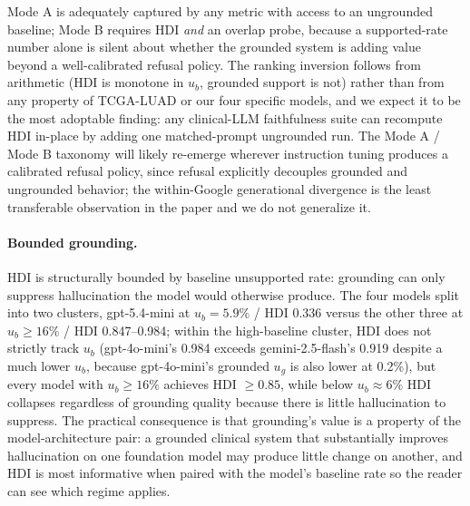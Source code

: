 \documentclass{article}
\theoremstyle{plain}
\begin{document}
Mode A is adequately captured by any metric with access to an ungrounded baseline; Mode B requires HDI \emph{and} an overlap probe, because a supported-rate number alone is silent about whether the grounded system is adding value beyond a well-calibrated refusal policy. The ranking inversion follows from arithmetic (HDI is monotone in $u_b$, grounded support is not) rather than from any property of TCGA-LUAD or our four specific models, and we expect it to be the most adoptable finding: any clinical-LLM faithfulness suite can recompute HDI in-place by adding one matched-prompt ungrounded run. The Mode A / Mode B taxonomy will likely re-emerge wherever instruction tuning produces a calibrated refusal policy, since refusal explicitly decouples grounded and ungrounded behavior; the within-Google generational divergence is the least transferable observation in the paper and we do not generalize it.

\paragraph{Bounded grounding.} HDI is structurally bounded by baseline unsupported rate: grounding can only suppress hallucination the model would otherwise produce. The four models split into two clusters, gpt-5.4-mini at $u_b{=}5.9\%$ / HDI 0.336 versus the other three at $u_b \geq 16\%$ / HDI 0.847--0.984; within the high-baseline cluster, HDI does not strictly track $u_b$ (gpt-4o-mini's 0.984 exceeds gemini-2.5-flash's 0.919 despite a much lower $u_b$, because gpt-4o-mini's grounded $u_g$ is also lower at 0.2\%), but every model with $u_b \geq 16\%$ achieves HDI $\geq 0.85$, while below $u_b \approx 6\%$ HDI collapses regardless of grounding quality because there is little hallucination to suppress. The practical consequence is that grounding's value is a property of the model-architecture pair: a grounded clinical system that substantially improves hallucination on one foundation model may produce little change on another, and HDI is most informative when paired with the model's baseline rate so the reader can see which regime applies.
\end{document}

